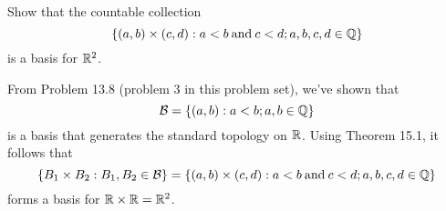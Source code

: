 \documentclass[a4paper, 12pt]{article}
\begin{document}
\begin{problem} 
Show that the countable collection \begin{equation*}
\{(a, b) \times (c, d) : a < b \:\text{and}\: c < d; a, b, c, d \in \mathbb{Q}\}
\end{equation*}
is a basis for $\mathbb{R}^2$.
\end{problem}
\begin{solution}
    From Problem 13.8 (problem 3 in this problem set), we've shown that \begin{equation*}
    \mathcal{B} = \{(a, b): a < b; a, b \in \mathbb{Q}\}
    \end{equation*}
    is a basis that generates the standard topology on $\mathbb{R}$. Using Theorem 15.1, it follows that \begin{equation*}
    \{B_1 \times B_2 : B_1, B_2 \in \mathcal{B}\} = \{(a, b) \times (c, d) : a < b \:\text{and}\: c < d; a, b, c, d \in \mathbb{Q}\}
    \end{equation*}
    forms a basis for $\mathbb{R} \times \mathbb{R} = \mathbb{R}^2$.
\end{solution}
\end{document}
